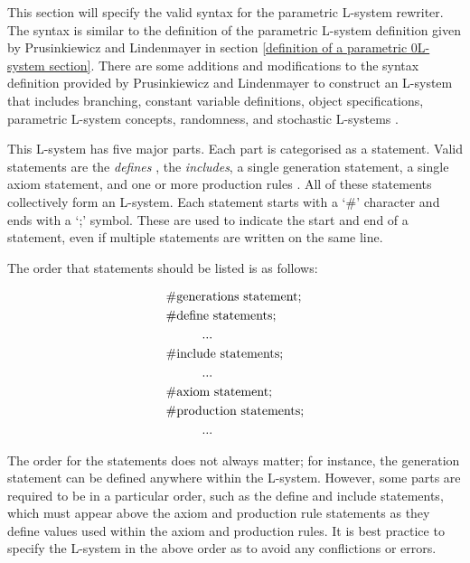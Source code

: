 This section will specify the valid syntax for the parametric L-system rewriter. The syntax is similar to the definition of the parametric L-system definition given by Prusinkiewicz and Lindenmayer in section \ref{definition of a parametric 0L-system section}. There are some additions and modifications to the syntax definition provided by Prusinkiewicz and Lindenmayer to construct an L-system that includes branching, constant variable definitions, object specifications, parametric L-system concepts, randomness, and stochastic L-systems \cite{prusinkiewicz2012algorithmic}. 

This L-system has five major parts. Each part is categorised as a statement. Valid statements are the \textit{defines} , the \textit{includes}, a single generation statement, a single axiom statement, and one or more production rules \cite{prusinkiewicz2013lindenmayer}. All of these statements collectively form an L-system. Each statement starts with a `\#' character and ends with a `;' symbol. These are used to indicate the start and end of a statement, even if multiple statements are written on the same line. 

\noindent
The order that statements should be listed is as follows: 

\begin{equation} \label{statement order example}
\begin{aligned}
	&\text{\#generations statement;}\\
	&\text{\#define statements;}\\
	&\text{\hspace{10mm}...}\\
	&\text{\#include statements;}\\
	&\text{\hspace{10mm}...}\\
	&\text{\#axiom statement;}\\
	&\text{\#production statements;}\\
	&\text{\hspace{10mm}...}\\
\end{aligned}
\end{equation}

The order for the statements does not always matter; for instance, the generation statement can be defined anywhere within the L-system. However, some parts are required to be in a particular order, such as the define and include statements, which must appear above the axiom and production rule statements as they define values used within the axiom and production rules. It is best practice to specify the L-system in the above order as to avoid any conflictions or errors.

